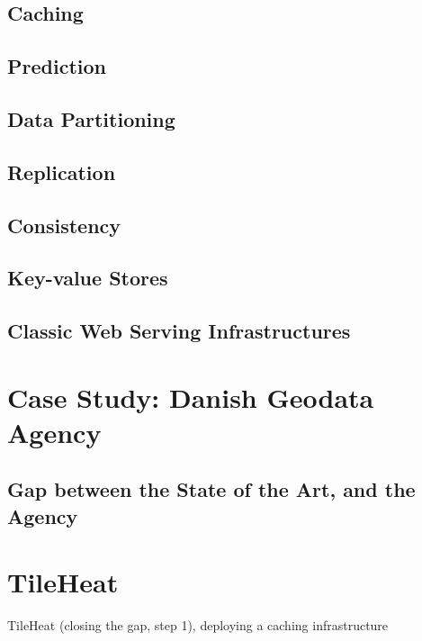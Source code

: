 \documentclass[11pt, oneside]{report}   	%
\begin{document}
\section{Caching}

\section{Prediction}

\section{Data Partitioning}

\section{Replication}

\section{Consistency}

\section{Key-value Stores}

\section{Classic Web Serving Infrastructures}

\chapter{Case Study: Danish Geodata Agency}

\section{Gap between the State of the Art, and the Agency}

\chapter{TileHeat}
TileHeat (closing the gap, step 1), deploying a caching infrastructure




\end{document}

